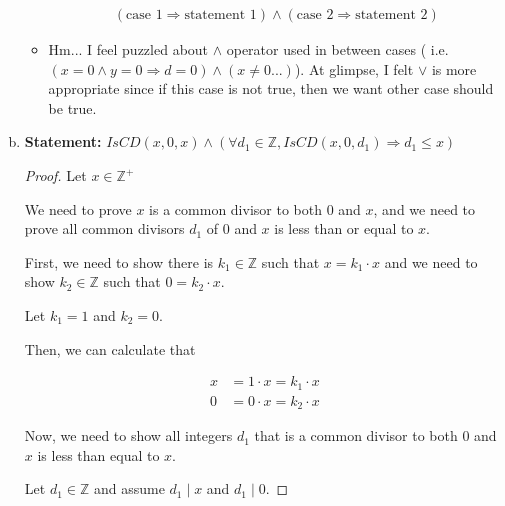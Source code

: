 \documentclass[12pt]{article}
\begin{document}
\begin{enumerate}[a.]
\begin{itemize}
        \begin{mdframed}
        \begin{align*}
        (\text{case 1} \Rightarrow \text{statement 1}) \land (\text{case 2} \Rightarrow \text{statement 2})
        \end{align*}
        \end{mdframed}

        \item Hm... I feel puzzled about $\land$ operator used in between cases (
        i.e. $(x = 0 \land y = 0 \Rightarrow d = 0) \land (x \neq 0 ...)$).
        At glimpse, I felt $\lor$ is more appropriate since if this case is not true,
        then we want other case should be true.
    \end{itemize}

    \item

    \textbf{Statement:} $IsCD(x,0,x) \land (\forall d_1 \in \mathbb{Z}, IsCD(x,0,d_1) \Rightarrow d_1 \leq x)$

    \begin{proof}
        Let $x \in \mathbb{Z}^{+}$

        \bigskip

        We need to prove $x$ is a common divisor to both 0 and $x$, and we need
        to prove all common divisors $d_1$ of 0 and $x$ is less than or equal to $x$.

        \bigskip

        First, we need to show there is $k_1 \in \mathbb{Z}$ such that
        $x = k_1 \cdot x$ and we need to show $k_2 \in \mathbb{Z}$ such that
        $0 = k_2 \cdot x$.

        \bigskip

        Let $k_1 = 1$ and $k_2 = 0$.

        \bigskip

        Then, we can calculate that

        \begin{align}
            x &= 1 \cdot x = k_1 \cdot x\\
            0 &= 0 \cdot x = k_2 \cdot x
        \end{align}

        \bigskip

        Now, we need to show all integers $d_1$ that is a common divisor to both 0 and $x$
        is less than equal to $x$.

        \bigskip

        Let $d_1 \in \mathbb{Z}$ and assume $d_1 \mid x$ and $d_1 \mid 0$.


\end{proof}
\end{enumerate}
\end{document}
